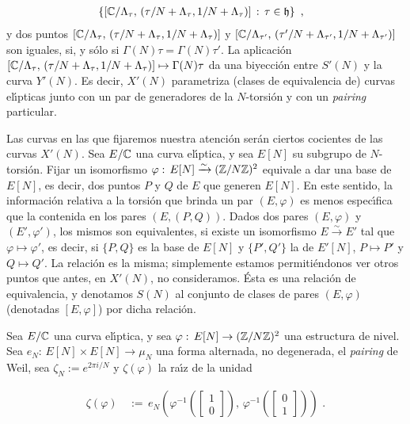 \begin{align*}
& \left\lbrace [\mathbb{C}/\Lambda_{\tau},\,
(\tau/N+\Lambda_{\tau},1/N+\Lambda_{\tau})]\,:\,\tau\in\mathfrak{h} \right\rbrace
\text{ ,}
\end{align*}
y dos puntos $[\mathbb{C}/\Lambda_{\tau},\,
(\tau/N+\Lambda_{\tau},1/N+\Lambda_{\tau})]$ y $[\mathbb{C}/\Lambda_{\tau'},\,
(\tau'/N+\Lambda_{\tau'},1/N+\Lambda_{\tau'})]$ son iguales, si, y s\'{o}lo si
$\Gamma(N)\tau=\Gamma(N)\tau'$. La aplicaci\'{o}n $[\mathbb{C}/\Lambda_{\tau},\,
(\tau/N+\Lambda_{\tau},1/N+\Lambda_{\tau})]\mapsto\Gamma(N)\tau$ da una
biyecci\'{o}n entre $S'(N)$ y la curva $Y'(N)$. Es decir, $X'(N)$ parametriza
(clases de equivalencia de) curvas el\'{\i}pticas junto con un par de generadores
de la $N$-torsi\'{o}n y con un \textit{pairing} particular. \cite{diamondShurman}

Las curvas en las que fijaremos nuestra atenci\'{o}n ser\'{a}n ciertos cocientes
de las curvas $X'(N)$. Sea $E/\mathbb{C}$ una curva el\'{\i}ptica, y sea $E[N]$ su
subgrupo de $N$-torsi\'{o}n. Fijar un isomorfismo
$\varphi:\,E[N]\xrightarrow{\sim}(\mathbb{Z}/N\mathbb{Z})^{2}$ equivale a dar una base de
$E[N]$, es decir, dos puntos $P$ y $Q$ de $E$ que generen $E[N]$. En este sentido,
la informaci\'{o}n relativa a la torsi\'{o}n que brinda un par $(E,\varphi)$ es
menos espec\'{\i}fica que la contenida en los pares $(E,(P,Q))$. Dados dos pares
$(E,\varphi)$ y $(E',\varphi')$, los mismos son equivalentes, si existe un
isomorfismo $E\xrightarrow{\sim}E'$ tal que $\varphi\mapsto\varphi'$, es decir,
si $\{P,Q\}$ es la base de $E[N]$ y $\{P',Q'\}$ la de $E'[N]$, $P\mapsto P'$ y
$Q\mapsto Q'$. La relaci\'{o}n es la misma; simplemente estamos permiti\'{e}ndonos
ver otros puntos que antes, en $X'(N)$, no consideramos. \'{E}sta es una
relaci\'{o}n de equivalencia, y denotamos $S(N)$ al conjunto de clases de pares
$(E,\varphi)$ (denotadas $[E,\varphi]$) por dicha relaci\'{o}n.

Sea $E/\mathbb{C}$ una curva el\'{\i}ptica, y sea
$\varphi:\,E[N]\rightarrow(\mathbb{Z}/N\mathbb{Z})^{2}$ una estructura de nivel. Sea
$e_{N}:\,E[N]\times E[N]\rightarrow\mu_{N}$ una forma alternada, no degenerada,
el \textit{pairing} de Weil, sea $\zeta_{N}:=e^{2\pi i/N}$ y $\zeta(\varphi)$ la
ra\'{\i}z de la unidad

\begin{align*}
\zeta(\varphi) & \,:=\,e_{N}\left(
\varphi^{-1}\left(\begin{bmatrix}1\\0\end{bmatrix}\right),\,
\varphi^{-1}\left(\begin{bmatrix}0\\1\end{bmatrix}\right)\right)
\text{ .}
\end{align*}

